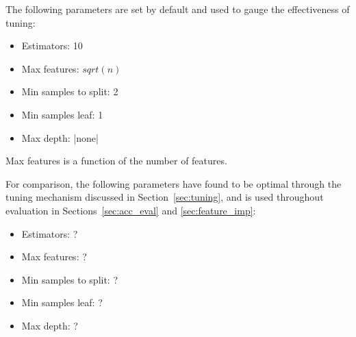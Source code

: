 The following parameters are set by default and used to gauge the effectiveness
of tuning:
\begin{itemize}[noitemsep]
  \item Estimators: 10
  \item Max features: $sqrt(n)$
  \item Min samples to split: 2
  \item Min samples leaf: 1
  \item Max depth: |none|
\end{itemize}
Max features is a function of the number of features.

For comparison, the following parameters have found to be optimal through the tuning mechanism
discussed in Section~\ref{sec:tuning}, and is used throughout evaluation in
Sections~\ref{sec:acc_eval} and \ref{sec:feature_imp}:
\begin{itemize}[noitemsep]
  \item Estimators: ?
  \item Max features: ?
  \item Min samples to split: ?
  \item Min samples leaf: ?
  \item Max depth: ?
\end{itemize}

